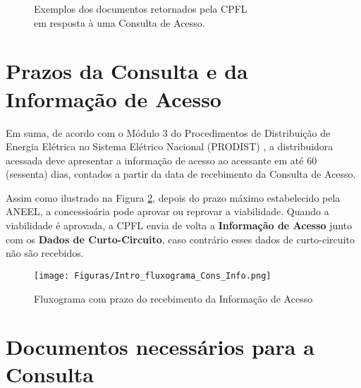     \begin{figure}[H]
        \centering
        \qquad
        \caption{\label{fig:RespostasConsulta}Exemplos dos documentos retornados pela CPFL\\em resposta à uma Consulta de Acesso.}
    \end{figure}

\section{Prazos da Consulta e da Informação de Acesso}

Em suma, de acordo com o Módulo 3 do Procedimentos de Distribuição de Energia Elétrica no Sistema Elétrico Nacional (PRODIST) {\color{blue} \cite{Modulo3Prodist}}, a distribuidora acessada deve apresentar a informação de acesso ao acessante em até 60 (sessenta) dias, contados a partir da data de recebimento da Consulta de Acesso.

Assim como ilustrado na Figura \ref{fig:fluxoConsInfo}, depois do prazo máximo estabelecido pela ANEEL, a concessioária pode aprovar ou reprovar a viabilidade. Quando a viabilidade é aprovada, a CPFL envia de volta a \textbf{Informação de Acesso} junto com os \textbf{Dados de Curto-Circuito}, caso contrário esses dados de curto-circuito não são recebidos. 

    \begin{figure} [H]
        \centering
        \texttt{[image: Figuras/Intro\_fluxograma\_Cons\_Info.png]}
        \caption{Fluxograma com prazo do recebimento da Informação de Acesso}
        \label{fig:fluxoConsInfo}
    \end{figure}

\section{Documentos necessários para a Consulta}

